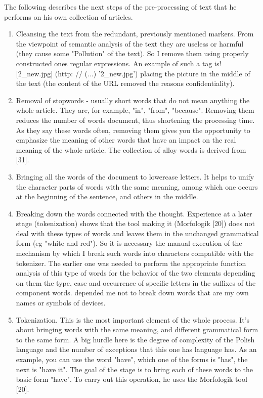 \documentclass[twoside,twocolumn]{article}
\begin{document}
	The following describes the next steps of the pre-processing of text that he performs on his own
	collection of articles.
	\begin{enumerate}
		\item Cleansing the text from the redundant, previously mentioned markers. From the viewpoint of
	semantic analysis of the text they are useless or harmful (they cause some
	"Pollution" of the text). So I remove them using properly constructed ones
	regular expressions. An example of such a tag is! [2\_new.jpg] (http: // (...)
	'2\_new.jpg') placing the picture in the middle of the text (the content of the URL removed the reasons
	confidentiality).
		\item Removal of stopwords - usually short words that do not mean anything
	the whole article. They are, for example, "in", "from", "because". Removing them reduces the number of words
	document, thus shortening the processing time. As they say these words
	often, removing them gives you the opportunity to emphasize the meaning of other words that have an impact
	on the real meaning of the whole article. The collection of alloy words is derived from [31].
		\item Bringing all the words of the document to lowercase letters. It helps to unify the character
	parts of words with the same meaning, among which one occurs at the beginning of the sentence,
	and others in the middle.
		\item Breaking down the words connected with the thought. Experience at a later stage (tokenization)
	shows that the tool making it (Morfologik [20]) does not deal with these types of words and leaves them in the unchanged grammatical form (eg "white and red"). So it is necessary
	the manual execution of the mechanism by which I break such words into characters
	compatible with the tokenizer. The earlier one was needed to perform the appropriate function
	analysis of this type of words for the behavior of the two elements depending on them
	the type, case and occurrence of specific letters in the suffixes of the component words. depended
	me not to break down words that are my own names or symbols of devices.
		\item Tokenization. This is the most important element of the whole process. It's about bringing words
	with the same meaning, and different grammatical form to the same form. A big hurdle
	here is the degree of complexity of the Polish language and the number of exceptions that this one has
	language has. As an example, you can use the word "have", which one of the forms is "has",
	the next is "have it". The goal of the stage is to bring each of these words to the basic form
	"have". To carry out this operation, he uses the Morfologik tool [20].
		\end{enumerate}
	
\end{document}
